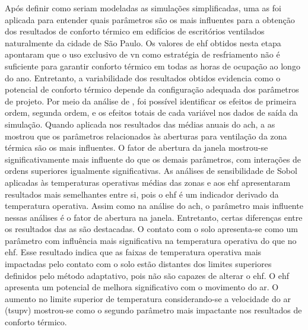 \documentclass[brazil,hardcopy,openany]{ufscthesis} %
\begin{document}
	Após definir como seriam modeladas as simulações simplificadas, uma \acrfull{as} foi aplicada para entender quais parâmetros são os mais influentes para a obtenção dos resultados de conforto térmico em edifícios de escritórios ventilados naturalmente da cidade de São Paulo.
	Os valores de \acrshort{ehf} obtidos nesta etapa apontaram que o uso exclusivo de \acrshort{vn} como estratégia de resfriamento não é suficiente para garantir conforto térmico em todas as horas de ocupação ao longo do ano. 
	Entretanto, a variabilidade dos resultados obtidos evidencia como o potencial de conforto térmico depende da configuração adequada dos parâmetros de projeto.
	Por meio da análise de , foi possível identificar os efeitos de primeira ordem, segunda ordem, e os efeitos totais de cada variável nos dados de saída da simulação.
	Quando aplicada nos resultados das médias anuais do \acrshort{ach}, a \acrshort{as} mostrou que os parâmetros relacionados às aberturas para ventilação da zona térmica são os mais influentes. O fator de abertura da janela mostrou-se significativamente mais influente do que os demais parâmetros, com interações de ordens superiores igualmente significativas.
	As análises de sensibilidade de Sobol aplicadas às temperaturas operativas médias das zonas e aos \acrshort{ehf} apresentaram resultados mais semelhantes entre si, pois o \acrshort{ehf} é um indicador derivado da temperatura operativa.
	Assim como na análise do \acrshort{ach}, o parâmetro mais influente nessas análises é o fator de abertura na janela.
	Entretanto, certas diferenças entre os resultados das \acrshort{as} são destacadas. 
	O contato com o solo apresenta-se como um parâmetro com influência mais significativa na temperatura operativa do que no \acrshort{ehf}. Esse resultado indica que as faixas de temperatura operativa mais impactadas pelo contato com o solo estão distantes dos limites superiores definidos pelo método adaptativo, pois não são capazes de alterar o \acrshort{ehf}.
	O \acrshort{ehf} apresenta um potencial de melhora significativo com o movimento do ar. O aumento no limite superior de temperatura considerando-se a velocidade do ar (\gls{tsupv}) mostrou-se como o segundo parâmetro mais impactante nos resultados de conforto térmico.
	
\end{document}
